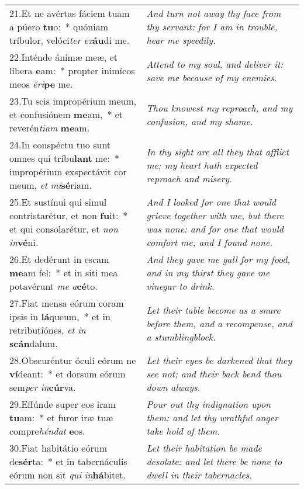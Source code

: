 \begin{longtable}{@{\hskip0pt} p{10cm} | p{6cm} @{\hskip0pt}}
21.\enspace Et ne avértas fáciem tuam a púero \textbf{tu}o:~* quóniam tríbulor, velóci\textit{ter} \textit{ex}\textbf{áu}di me.
 & \textit{\small And turn not away thy face from thy servant: for I am in trouble, hear me speedily.
}\\
22.\enspace Inténde ánimæ meæ, et líbera \textbf{e}am:~* propter inimícos meos \textit{é}\textit{ri}\textbf{pe} me.
 & \textit{\small Attend to my soul, and deliver it: save me because of my enemies.
}\\
23.\enspace Tu scis impropérium meum, et confusiónem \textbf{me}am,~* et reverén\textit{ti}\textit{am} \textbf{me}am.
 & \textit{\small Thou knowest my reproach, and my confusion, and my shame.
}\\
24.\enspace In conspéctu tuo sunt omnes qui tríbu\textbf{lant} me:~* impropérium exspectávit cor meum, \textit{et} \textit{mi}\textbf{sé}riam.
 & \textit{\small In thy sight are all they that afflict me; my heart hath expected reproach and misery.
}\\
25.\enspace Et sustínui qui simul contristarétur, et non \textbf{fu}it:~* et qui consolarétur, et \textit{non} \textit{in}\textbf{vé}ni.
 & \textit{\small And I looked for one that would grieve together with me, but there was none: and for one that would comfort me, and I found none.
}\\
26.\enspace Et dedérunt in escam \textbf{me}am fel:~* et in siti mea potavérunt \textit{me} \textit{a}\textbf{cé}to.
 & \textit{\small And they gave me gall for my food, and in my thirst they gave me vinegar to drink.
}\\
27.\enspace Fiat mensa eórum coram ipsis in \textbf{lá}queum,~* et in retributiónes, \textit{et} \textit{in} \textbf{scán}dalum.
 & \textit{\small Let their table become as a snare before them, and a recompense, and a stumblingblock.
}\\
28.\enspace Obscuréntur óculi eórum ne \textbf{ví}deant:~* et dorsum eórum sem\textit{per} \textit{in}\textbf{cúr}va.
 & \textit{\small Let their eyes be darkened that they see not; and their back bend thou down always.
}\\
29.\enspace Effúnde super eos iram \textbf{tu}am:~* et furor iræ tuæ compre\textit{hén}\textit{dat} \textbf{e}os.
 & \textit{\small Pour out thy indignation upon them: and let thy wrathful anger take hold of them.
}\\
30.\enspace Fiat habitátio eórum de\textbf{sér}ta:~* et in tabernáculis eórum non sit \textit{qui} \textit{in}\textbf{há}bitet.
 & \textit{\small Let their habitation be made desolate: and let there be none to dwell in their tabernacles.
}
\end{longtable}
